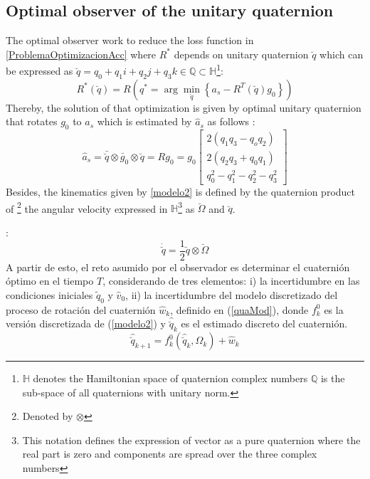 \documentclass[conference]{IEEEtran}
\begin{document}
\subsection{Optimal observer of the unitary quaternion}
The optimal observer work  to reduce the loss function in \ref{ProblemaOptimizacionAcc} where $R^*$ depends on unitary quaternion $\breve{q}$ which can be expressed as $\breve{q}=q_0+q_1i+q_2j+q_3k \in \mathbb{Q} \subset \mathbb{H}$\footnote{$\mathbb{H}$ denotes the Hamiltonian space of quaternion complex numbers $\mathbb{Q}$ is the sub-space of all quaternions with unitary norm.}:
\begin{equation}\label{ProblemaOptimizacionAcc}
R^*(\breve{q})=R\left(q^*=\arg\min_{\breve{q}}\left\{a_s-R^T(\breve{q})g_0\right\}\right)
\end{equation} 
Thereby, the solution of that optimization is given by optimal unitary quaternion that rotates $g_0$ to $a_s$ which is estimated by $\hat{a}_s$ as follows \cite{Sola2012}:
\begin{equation}\label{chap2:ModeloMedicion}
\hat{a}_s=\bar{\breve{q}}\otimes\breve{g_0}\otimes\breve{q}=Rg_0=g_0\begin{bmatrix}2(q_1q_3-q_oq_2)\\2(q_2q_3+q_0q_1)\\q_0^2-q_1^2-q_2^2-q_3^2\end{bmatrix}
\end{equation}
Besides, the kinematics given by \ref{modelo2} is defined by the quaternion product of \footnote{Denoted by $\otimes$} the angular velocity expressed in $\mathbb{H}$\footnote{This notation defines the expression of vector as a pure quaternion where the real part is zero and components are spread over the three complex numbers} as $\breve{\Omega}$ and $\breve{q}$.\par:
\begin{equation}\label{modelo2}
\dot{\breve{q}}=\frac{1}{2}\breve{q}\otimes\breve{\Omega}
\end{equation}
A partir de esto, el reto asumido por el observador es determinar el cuaternión óptimo en el tiempo $T$, considerando de tres elementos: i) la incertidumbre en las condiciones iniciales $\tilde{q}_0$ y $\hat{v}_0$, ii) la incertidumbre del modelo discretizado del proceso de rotación del cuaternión $\hat{w}_k$, definido en (\ref{quaMod}), donde $f^0_k$ es la versión discretizada de (\ref{modelo2}) y $\hat{\breve{q}}_{k}$ es el estimado discreto del cuaternión.
\begin{equation}
\label{quaMod}
\hat{\breve{q}}_{k+1}=f^0_k(\hat{\breve{q}}_k,\Omega_k)+\hat{w}_k
\end{equation}
\end{document}
